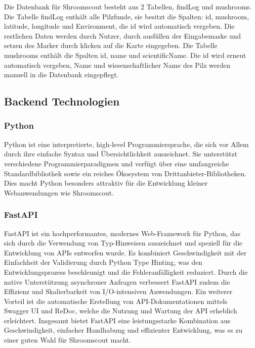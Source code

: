 \documentclass[../main.tex]{subfiles} %
\begin{document}
Die Datenbank für Shroomscout besteht aus 2 Tabellen, findLog und mushrooms.
Die Tabelle findLog enthält alle Pilzfunde, sie besitzt die Spalten: id, mushroom, latitude, longitude und Environment, die id wird automatisch vergeben. 
Die restlichen Daten werden durch Nutzer, durch ausfüllen der Eingabemaske und setzen des Marker durch klicken auf die Karte eingegeben.
Die Tabelle mushrooms enthält die Spalten id, name und scientificName. Die id wird erneut automatisch vergeben, Name und wissenschaftlicher Name des Pilz werden manuell in die Datenbank eingepflegt.


\subsection{Backend Technologien} %

\subsubsection{Python}

Python ist eine interpretierte, high-level Programmiersprache, die sich vor Allem durch ihre einfache Syntax und Übersichtlichkeit auszeichnet. 
Sie unterstützt verschiedene Programmierparadigmen und verfügt über eine umfangreiche Standardbibliothek sowie ein reiches Ökosystem von Drittanbieter-Bibliotheken. 
Dies macht Python besonders attraktiv für die Entwicklung kleiner Webanwendungen wie Shroomscout.

\subsubsection*{FastAPI}
FastAPI ist ein hochperformantes, modernes Web-Framework für Python, das sich durch die Verwendung von Typ-Hinweisen auszeichnet und speziell für die Entwicklung von APIs entworfen wurde.
Es kombiniert Geschwindigkeit mit der Einfachheit der Validierung durch Python Type Hinting, was den Entwicklungsprozess beschleunigt und die Fehleranfälligkeit reduziert. 
Durch die native Unterstützung asynchroner Anfragen verbessert FastAPI zudem die Effizienz und Skalierbarkeit von I/O-intensiven Anwendungen. 
Ein weiterer Vorteil ist die automatische Erstellung von API-Dokumentationen mittels Swagger UI und ReDoc, welche die Nutzung und Wartung der API erheblich erleichtert. 
Insgesamt bietet FastAPI eine leistungsstarke Kombination aus Geschwindigkeit, einfacher Handhabung und effizienter Entwicklung, was es zu einer guten Wahl für Shroomscout macht.
\end{document}
